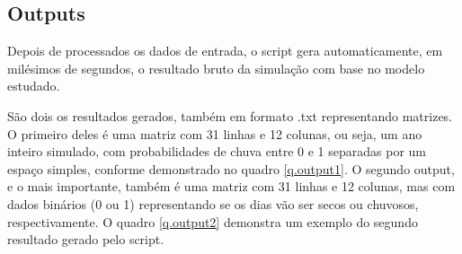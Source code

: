 \subsection{Outputs}
\label{ss.outputs}
Depois de processados os dados de entrada, o script gera automaticamente, em milésimos de segundos, o resultado bruto da simulação com base no modelo estudado.

São dois os resultados gerados, também em formato .txt representando matrizes. O primeiro deles é uma matriz com 31 linhas e 12 colunas, ou seja, um ano inteiro simulado, com probabilidades de chuva entre 0 e 1 separadas por um espaço simples, conforme demonstrado no quadro \ref{q.output1}. O segundo output, e o mais importante, também é uma matriz com 31 linhas e 12 colunas, mas com dados binários (0 ou 1) representando se os dias vão ser secos ou chuvosos, respectivamente. O quadro \ref{q.output2} demonstra um exemplo do segundo resultado gerado pelo script.

